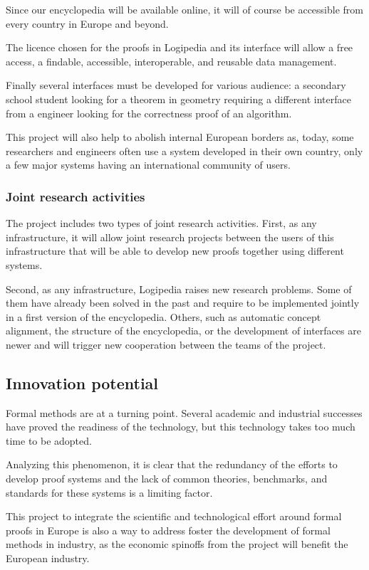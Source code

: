 Since our encyclopedia will be available online, it will of course be
accessible from every country in Europe and beyond.

The licence chosen for the proofs in {\sc Logipedia} and its interface
will allow a free access, a findable, accessible, interoperable, and
reusable data management.

Finally several interfaces must be developed for various audience: a
secondary school student looking for a theorem in geometry requiring a
different interface from a engineer looking for the correctness proof
of an algorithm.

This project will also help to abolish internal European borders as,
today, some researchers and engineers often use a system developed in
their own country, only a few major systems having an international
community of users.

\subsubsection{Joint research activities}

The project includes two types of joint research activities.  First,
as any infrastructure, it will allow joint research projects
between the users of this infrastructure that will be able to develop
new proofs together using different systems.

Second, as any infrastructure, {\sc Logipedia} raises new research
problems. Some of them have already been solved in the past and
require to be implemented jointly in a first version of the
encyclopedia. Others, such as automatic concept alignment, the
structure of the encyclopedia, or the development of interfaces are
newer and will trigger new cooperation between the teams of the
project.


\subsection{Innovation potential}

Formal methods are at a turning point. Several academic and
industrial successes have proved the readiness of the technology, but
this technology takes too much time to be adopted.


Analyzing this phenomenon, it is clear that the redundancy of the
efforts to develop proof systems and the lack of common theories,
benchmarks, and standards for these systems is a limiting factor.

This project to integrate the scientific and technological effort
around formal proofs in Europe is also a way to address foster the
development of formal methods in industry, as the economic spinoffs
from the project will benefit the European industry.

